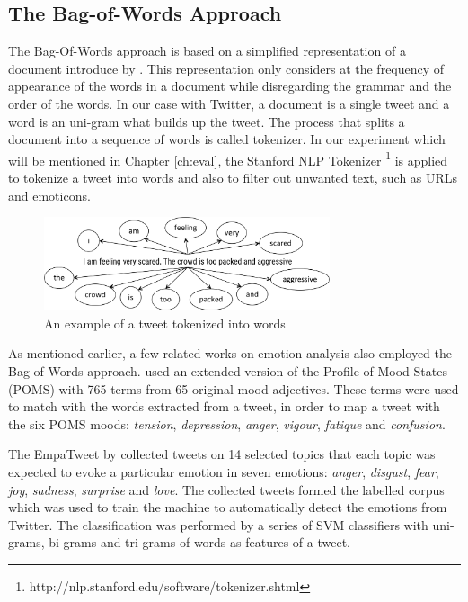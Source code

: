 \subsection{The Bag-of-Words Approach}
The Bag-Of-Words approach is based on a simplified representation of a document introduce by \citet{joachims1996probabilistic}. This representation only considers at the frequency of appearance of the words in a document while disregarding the grammar and the order of the words. In our case with Twitter, a document is a single tweet and a word is an uni-gram what builds up the tweet. The process that splits a document into a sequence of words is called tokenizer. In our experiment which will be mentioned in Chapter \ref{ch:eval}, the Stanford NLP Tokenizer \footnote{http://nlp.stanford.edu/software/tokenizer.shtml} is applied to tokenize a tweet into words and also to filter out unwanted text, such as URLs and emoticons. 

\begin{figure}[htb!] 
\centering    
\includegraphics[width=0.75\textwidth]{Tokenizer}
\caption{An example of a tweet tokenized into words}
\label{fig:tokenizer}
\end{figure}

As mentioned earlier, a few related works on emotion analysis also employed the Bag-of-Words approach. \citet{bollen2009modeling} used an extended version of the Profile of Mood States (POMS) with 765 terms from 65 original mood adjectives. These terms were used to match with the words extracted from a tweet, in order to map a tweet with the six POMS moods: \textit{tension}, \textit{depression}, \textit{anger}, \textit{vigour}, \textit{fatique} and \textit{confusion}.

The EmpaTweet by \citet{roberts2012empatweet} collected tweets on 14 selected topics that each topic was expected to evoke a particular emotion in seven emotions: \textit{anger}, \textit{disgust}, \textit{fear}, \textit{joy}, \textit{sadness}, \textit{surprise} and \textit{love}. The collected tweets formed the labelled corpus which was used to train the machine to automatically detect the emotions from Twitter. The classification was performed by a series of SVM classifiers with uni-grams, bi-grams and tri-grams of words as features of a tweet.

